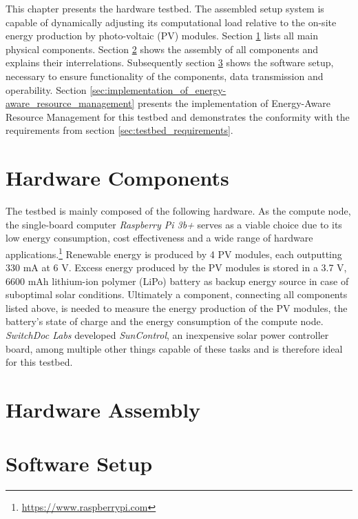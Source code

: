 This chapter presents the hardware testbed. The assembled setup system is
capable of dynamically adjusting its computational load relative to the on-site
energy production by photo-voltaic (PV) modules. Section
\ref{sec:hardware_components} lists all main physical components. Section
\ref{sec:hardware_assembly} shows the assembly of all components and explains
their interrelations. Subsequently section \ref{sec:software_setup} shows the
software setup, necessary to ensure functionality of the components, data
transmission and operability.  Section
\ref{sec:implementation_of_energy-aware_resource_management} presents the
implementation of Energy-Aware Resource Management for this testbed and
demonstrates the conformity with the requirements from section
\ref{sec:testbed_requirements}.

\section{Hardware Components}
\label{sec:hardware_components}

The testbed is mainly composed of the following hardware. As the compute node,
the single-board computer \emph{Raspberry Pi 3b+} serves as a viable choice due
to its low energy consumption, cost effectiveness and a wide range of hardware
applications.\footnote{\url{https://www.raspberrypi.com}} Renewable energy is
produced by 4 PV modules, each outputting 330 mA at 6 V. Excess energy produced
by the PV modules is stored in a 3.7 V, 6600 mAh lithium-ion polymer (LiPo)
battery as backup energy source in case of suboptimal solar conditions.
Ultimately a component, connecting all components listed above, is needed to
measure the energy production of the PV modules, the battery's state of charge
and the energy consumption of the compute node. \emph{SwitchDoc Labs} developed
\emph{SunControl}, an inexpensive solar power controller board, among multiple
other things capable of these tasks \cite{switchdoc_suncontrol} and is therefore
ideal for this testbed.

\section{Hardware Assembly}
\label{sec:hardware_assembly}

\section{Software Setup}
\label{sec:software_setup}

